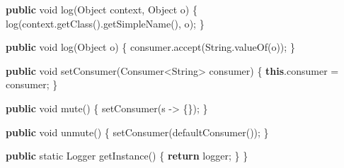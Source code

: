 \documentclass[11pt]{article}
\newenvironment{Shaded}{}{}
\newcommand{\KeywordTok}[1]{\textcolor[rgb]{0.00,0.44,0.13}{\textbf{{#1}}}}
\newcommand{\DataTypeTok}[1]{\textcolor[rgb]{0.56,0.13,0.00}{{#1}}}
\newcommand{\FunctionTok}[1]{\textcolor[rgb]{0.02,0.16,0.49}{{#1}}}
\newcommand{\NormalTok}[1]{{#1}}
\newcommand{\ControlFlowTok}[1]{\textcolor[rgb]{0.00,0.44,0.13}{\textbf{{#1}}}}
\newcommand{\OperatorTok}[1]{\textcolor[rgb]{0.40,0.40,0.40}{{#1}}}
\newcommand{\BuiltInTok}[1]{{#1}}
\begin{document}
\begin{Shaded}
\begin{Highlighting}[]
    \KeywordTok{public} \DataTypeTok{void} \FunctionTok{log}\OperatorTok{(}\BuiltInTok{Object}\NormalTok{ context}\OperatorTok{,} \BuiltInTok{Object}\NormalTok{ o}\OperatorTok{)} \OperatorTok{\{}
        \FunctionTok{log}\OperatorTok{(}\NormalTok{context}\OperatorTok{.}\FunctionTok{getClass}\OperatorTok{().}\FunctionTok{getSimpleName}\OperatorTok{(),}\NormalTok{ o}\OperatorTok{);}
    \OperatorTok{\}}

    \KeywordTok{public} \DataTypeTok{void} \FunctionTok{log}\OperatorTok{(}\BuiltInTok{Object}\NormalTok{ o}\OperatorTok{)} \OperatorTok{\{}
\NormalTok{        consumer}\OperatorTok{.}\FunctionTok{accept}\OperatorTok{(}\BuiltInTok{String}\OperatorTok{.}\FunctionTok{valueOf}\OperatorTok{(}\NormalTok{o}\OperatorTok{));}
    \OperatorTok{\}}

    \KeywordTok{public} \DataTypeTok{void} \FunctionTok{setConsumer}\OperatorTok{(}\NormalTok{Consumer}\OperatorTok{\textless{}}\BuiltInTok{String}\OperatorTok{\textgreater{}}\NormalTok{ consumer}\OperatorTok{)} \OperatorTok{\{}
        \KeywordTok{this}\OperatorTok{.}\FunctionTok{consumer} \OperatorTok{=}\NormalTok{ consumer}\OperatorTok{;}
    \OperatorTok{\}}

    \KeywordTok{public} \DataTypeTok{void} \FunctionTok{mute}\OperatorTok{()} \OperatorTok{\{}
        \FunctionTok{setConsumer}\OperatorTok{(}\NormalTok{s }\OperatorTok{{-}\textgreater{}} \OperatorTok{\{\});}
    \OperatorTok{\}}

    \KeywordTok{public} \DataTypeTok{void} \FunctionTok{unmute}\OperatorTok{()} \OperatorTok{\{}
        \FunctionTok{setConsumer}\OperatorTok{(}\FunctionTok{defaultConsumer}\OperatorTok{());}
    \OperatorTok{\}}

    \KeywordTok{public} \DataTypeTok{static} \BuiltInTok{Logger} \FunctionTok{getInstance}\OperatorTok{()} \OperatorTok{\{}
        \ControlFlowTok{return}\NormalTok{ logger}\OperatorTok{;}
    \OperatorTok{\}}
\OperatorTok{\}}
\end{Highlighting}
\end{Shaded}
\end{document}
